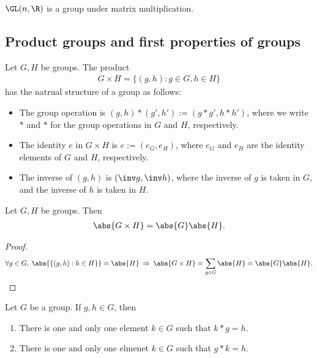 \documentclass{article}
\begin{document}
\begin{theorem}
    $\GL(n,\R)$ is a group under matrix multiplication.
\end{theorem}

\subsection{Product groups and first properties of groups}

\begin{theorem}
    Let $G,H$ be groups. The product
    \begin{align*}
        G\times H=\{(g,h):g\in G, h\in H\}
    \end{align*}
    has the natrual structure of a group as follows:
    \begin{itemize}
        \item The group operation is $(g,h)*(g',h'):=(g* g', h* h')$, 
        where we write $*$ and $*$ for the group operations in $G$ and $H$, respectively.
        \item The identity $e$ in $G\times H$ is $e:=(e_G, e_H)$, where $e_G$ and 
        $e_H$ are the identity elements of $G$ and $H$, respectively.
        \item The inverse of $(g,h)$ is $(\inv g, \inv h)$, where the inverse of $g$ is taken in $G$,
        and the inverse of $h$ is taken in $H$.
    \end{itemize}
\end{theorem}

\begin{corollary*}
    Let $G,H$ be groups. Then
    \begin{align*}
        \abs{G\times H} = \abs{G}\abs{H}.
    \end{align*}
    \begin{proof}
        $$\forall g\in G,\:\abs{\{(g,h) : h\in H\}}=\abs{H} \:\Rightarrow\: \abs{G\times H} = \sum_{g\in G}\abs{H} = \abs{G}\abs{H}.$$
    \end{proof}
\end{corollary*}

\setcounter{theorem}{5}
\begin{lemma}
    Let $G$ be a group. If $g,h\in G$, then
    \begin{enumerate}
        \item There is one and only one element $k\in G$ such that $k* g=h$.
        \item There is one and only one elmenet $k\in G$ such that $g* k=h$.
    \end{enumerate}
\end{lemma}
\end{document}
